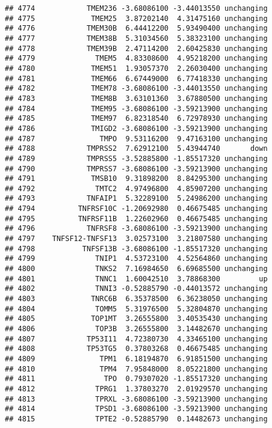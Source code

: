 \documentclass[]{article}
\begin{document}
\begin{verbatim}
## 4774            TMEM236 -3.68086100 -3.44013550 unchanging
## 4775             TMEM25  3.87202140  4.31475160 unchanging
## 4776            TMEM30B  6.44412200  5.93490400 unchanging
## 4777            TMEM38B  5.31034560  5.38323100 unchanging
## 4778            TMEM39B  2.47114200  2.60425830 unchanging
## 4779              TMEM5  4.83308600  4.95218200 unchanging
## 4780             TMEM51  1.93057370  2.26030400 unchanging
## 4781             TMEM66  6.67449000  6.77418330 unchanging
## 4782             TMEM78 -3.68086100 -3.44013550 unchanging
## 4783             TMEM8B  3.63101360  3.67880500 unchanging
## 4784             TMEM95 -3.68086100 -3.59213900 unchanging
## 4785             TMEM97  6.82318540  6.72978930 unchanging
## 4786             TMIGD2 -3.68086100 -3.59213900 unchanging
## 4787               TMPO  9.53116200  9.47163100 unchanging
## 4788            TMPRSS2  7.62912100  5.43944740       down
## 4789            TMPRSS5 -3.52885800 -1.85517320 unchanging
## 4790            TMPRSS7 -3.68086100 -3.59213900 unchanging
## 4791             TMSB10  9.31898200  8.84295300 unchanging
## 4792              TMTC2  4.97496800  4.85907200 unchanging
## 4793            TNFAIP1  5.32289100  5.24986200 unchanging
## 4794          TNFRSF10C -1.20692980  0.46675485 unchanging
## 4795          TNFRSF11B  1.22602960  0.46675485 unchanging
## 4796            TNFRSF8 -3.68086100 -3.59213900 unchanging
## 4797    TNFSF12-TNFSF13  3.02573100  3.21807580 unchanging
## 4798           TNFSF13B -3.68086100 -1.85517320 unchanging
## 4799              TNIP1  4.53723100  4.52564860 unchanging
## 4800              TNKS2  7.16984650  6.69685500 unchanging
## 4801              TNNC1  1.60042510  3.78868300         up
## 4802              TNNI3 -0.52885790 -0.44013572 unchanging
## 4803             TNRC6B  6.35378500  6.36238050 unchanging
## 4804              TOMM5  5.31976500  5.32804870 unchanging
## 4805             TOP1MT  3.26555800  3.40535430 unchanging
## 4806              TOP3B  3.26555800  3.14482670 unchanging
## 4807            TP53I11  4.72380730  4.33465100 unchanging
## 4808            TP53TG5  0.37803268  0.46675485 unchanging
## 4809               TPM1  6.18194870  6.91851500 unchanging
## 4810               TPM4  7.95848000  8.05221800 unchanging
## 4811                TPO  0.79307020 -1.85517320 unchanging
## 4812              TPRG1  1.37803270  2.01929570 unchanging
## 4813              TPRXL -3.68086100 -3.59213900 unchanging
## 4814              TPSD1 -3.68086100 -3.59213900 unchanging
## 4815              TPTE2 -0.52885790  0.14482673 unchanging

\end{verbatim}
\end{document}

